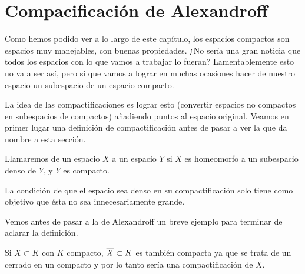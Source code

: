 
\section{Compacificación de Alexandroff}

Como hemos podido ver a lo largo de este capítulo, los espacios compactos son espacios muy manejables, con buenas propiedades. ¿No sería una gran noticia que todos los espacios con lo que vamos a trabajar lo fueran? Lamentablemente esto no va a ser así, pero si que vamos a lograr en muchas ocasiones hacer de nuestro espacio un subespacio de un espacio compacto.


La idea de las compactificaciones es lograr esto (convertir espacios no compactos en subespacios de compactos) añadiendo puntos al espacio original.
Veamos en primer lugar una definición de compactificación antes de pasar a ver la que da nombre a esta sección.

\begin{defi}[Compactificación]
Llamaremos  de un espacio $X$ a un espacio $Y$ si $X$ es homeomorfo a un subespacio denso de $Y$, y $Y$ es compacto.
\end{defi}


La condición de que el espacio sea denso en su compactificación solo tiene como objetivo que ésta no sea innecesariamente grande. 


Vemos antes de pasar a la de Alexandroff un breve ejemplo para terminar de aclarar la definición.
\begin{exa}
	Si $X\subset K$ con $K$ compacto, $\overline{X}\subset K$ es también compacta ya que se trata de un cerrado en un compacto y por lo tanto sería una compactificación de $X$.
\end{exa}

